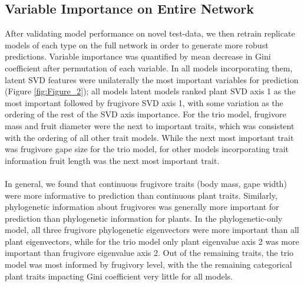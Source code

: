 \documentclass[openacc]{rsproca_new}%
\begin{document}
    
\subsection*{Variable Importance on Entire Network}
After validating model performance on novel test-data, we then retrain replicate models of each type on the full network in order to generate more robust predictions. Variable importance was quantified by mean decrease in Gini coefficient after permutation of each variable. In all models incorporating them, latent SVD features were unilaterally the most important variables for prediction (Figure \ref{fig:Figure_2}); all models latent models ranked plant SVD axis 1 as the most important followed by frugivore SVD axis 1, with some variation as the ordering of the rest of the SVD axis importance. For the trio model, frugivore mass and fruit diameter were the next to important traits, which was consistent with the ordering of all other trait models. While the next most important trait was frugivore gape size for the trio model, for other models incorporating trait information fruit length was the next most important trait. 

\paragraph*{}
In general, we found that continuous frugivore traits (body mass, gape width) were more informative to prediction than continuous plant traits. Similarly, phylogenetic information about frugivores was generally more important for prediction than phylogenetic information for plants. In the phylogenetic-only model, all three frugivore phylogenetic eigenvectors were more important than all plant eigenvectors, while for the trio model only plant eigenvalue axis 2 was more important than frugivore eigenvalue axis 2. Out of the remaining traits, the trio model was most informed by frugivory level, with the the remaining categorical plant traits impacting Gini coefficient very little for all models. 
\end{document}
